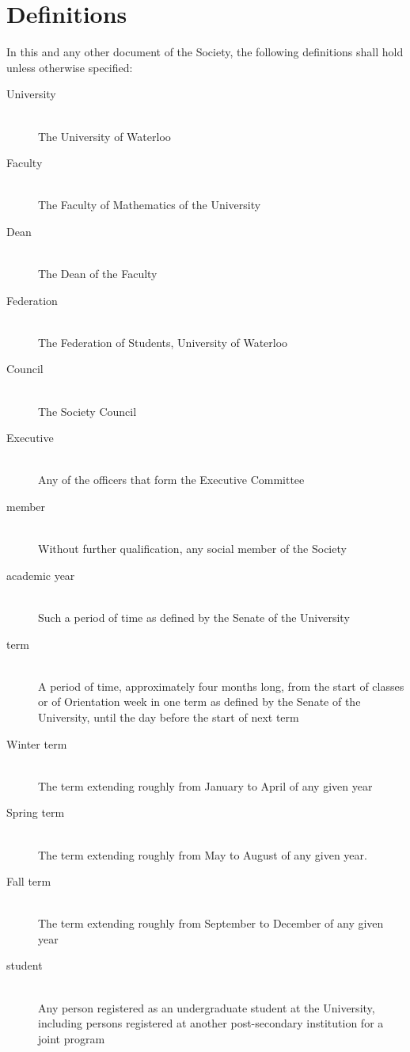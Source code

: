 \section{Definitions}
In this and any other document of the Society, the following definitions shall
hold unless otherwise specified:
\begin{description}
\item[University]\hfill\\
  The University of Waterloo
\item[Faculty]\hfill\\
  The Faculty of Mathematics of the University
\item[Dean]\hfill\\
  The Dean of the Faculty
\item[Federation]\hfill\\
  The Federation of Students, University of Waterloo
\item[Council]\hfill\\
  The Society Council
\item[Executive]\hfill\\
  Any of the officers that form the Executive Committee
\item[member]\hfill\\
  Without further qualification, any social member of the Society
\item[academic year]\hfill\\
  Such a period of time as defined by the Senate of the University
\item[term]\hfill\\
  A period of time, approximately four months long, from the start of classes or
  of Orientation week in one term as defined by the Senate of the University,
  until the day before the start of next term
\item[Winter term]\hfill\\
  The term extending roughly from January to April of any given year
\item[Spring term]\hfill\\
  The term extending roughly from May to August of any given year.
\item[Fall term]\hfill\\
  The term extending roughly from September to December of any given year
\item[student]\hfill\\
  Any person registered as an undergraduate student at the University, including
  persons registered at another post-secondary institution for a joint program

\end{description}

